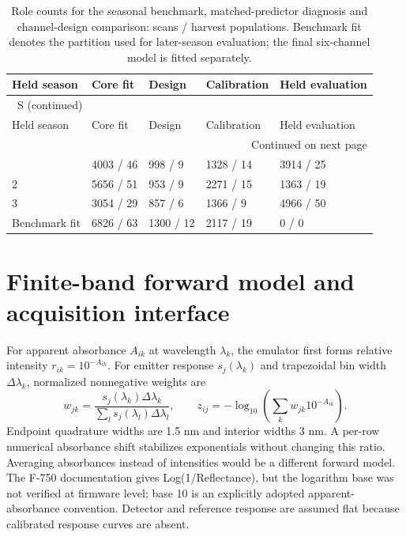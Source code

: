 \documentclass[10pt,a4paper]{article}
\renewcommand{\thetable}{S\arabic{table}}
\begin{document}
\begingroup\small
\setlength{\tabcolsep}{3.5pt}
\renewcommand{\arraystretch}{1.10}
\begin{longtable}{lllll}
\caption{Role counts for the seasonal benchmark, matched-predictor diagnosis and channel-design comparison: scans / harvest populations. Benchmark fit denotes the partition used for later-season evaluation; the final six-channel model is fitted separately.}\label{tab:roles}\\
\toprule
Held season & Core fit & Design & Calibration & Held evaluation \\
\midrule
\endfirsthead
\multicolumn{5}{l}{\tablename~\thetable{} (continued)}\\
\toprule
Held season & Core fit & Design & Calibration & Held evaluation \\
\midrule
\endhead
\midrule
\multicolumn{5}{r}{Continued on next page}\\
\endfoot
\bottomrule
\endlastfoot
1 & 4003 / 46 & 998 / 9 & 1328 / 14 & 3914 / 25 \\
2 & 5656 / 51 & 953 / 9 & 2271 / 15 & 1363 / 19 \\
3 & 3054 / 29 & 857 / 6 & 1366 / 9 & 4966 / 50 \\
Benchmark fit & 6826 / 63 & 1300 / 12 & 2117 / 19 & 0 / 0 \\
\end{longtable}
\endgroup

\section{Finite-band forward model and acquisition interface}
For apparent absorbance $A_{ik}$ at wavelength $\lambda_k$, the emulator first forms relative intensity $r_{ik}=10^{-A_{ik}}$. For emitter response $s_j(\lambda_k)$ and trapezoidal bin width $\Delta\lambda_k$, normalized nonnegative weights are
\[
 w_{jk}=\frac{s_j(\lambda_k)\Delta\lambda_k}{\sum_l s_j(\lambda_l)\Delta\lambda_l},\qquad
 z_{ij}=-\log_{10}\!\left(\sum_k w_{jk}10^{-A_{ik}}\right).
\]
Endpoint quadrature widths are 1.5 nm and interior widths 3 nm. A per-row numerical absorbance shift stabilizes exponentials without changing this ratio. Averaging absorbances instead of intensities would be a different forward model. The F-750 documentation gives Log(1/Reflectance), but the logarithm base was not verified at firmware level; base 10 is an explicitly adopted apparent-absorbance convention. Detector and reference response are assumed flat because calibrated response curves are absent.
\end{document}

